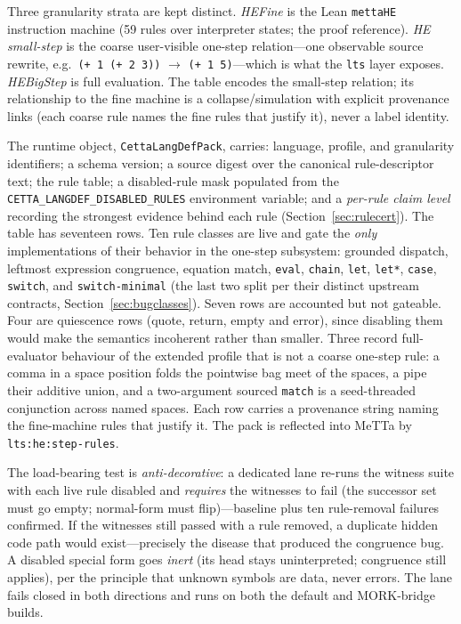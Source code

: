 \documentclass[11pt]{article}
\newcommand{\code}[1]{\texttt{#1}}
\begin{document}
Three granularity strata are kept distinct.  \emph{HEFine} is the Lean
\code{mettaHE} instruction machine (59 rules over interpreter states;
the proof reference).  \emph{HE small-step} is the coarse user-visible
one-step relation---one observable source rewrite, e.g.\
\code{(+ 1 (+ 2 3))} $\to$ \code{(+ 1 5)}---which is what the
\code{lts} layer exposes.  \emph{HEBigStep} is full evaluation.  The
table encodes the small-step relation; its relationship to the fine machine is a
collapse/simulation with explicit provenance links (each coarse rule
names the fine rules that justify it), never a label identity.

The runtime object, \code{CettaLangDefPack}, carries: language,
profile, and granularity identifiers; a schema version; a source
digest over the canonical rule-descriptor text; the rule table; a
disabled-rule mask populated from the
\code{CETTA\_LANGDEF\_DISABLED\_RULES} environment variable; and a
\emph{per-rule claim level} recording the strongest evidence behind
each rule (Section~\ref{sec:rulecert}).  The table has seventeen rows.  Ten rule classes are live and
gate the \emph{only} implementations of their behavior in the one-step
subsystem: grounded dispatch, leftmost expression congruence, equation
match, \code{eval}, \code{chain}, \code{let}, \code{let*},
\code{case}, \code{switch}, and \code{switch-minimal} (the last two
split per their distinct upstream contracts,
Section~\ref{sec:bugclasses}).  Seven rows are accounted but not
gateable.  Four are quiescence rows (quote, return, empty and error),
since disabling them would make the semantics incoherent rather than
smaller.  Three record full-evaluator behaviour of the extended profile
that is not a coarse one-step rule: a comma in a space position folds
the pointwise bag meet of the spaces, a pipe their additive union, and a
two-argument sourced \code{match} is a seed-threaded conjunction across
named spaces.  Each row carries a
provenance string naming the fine-machine rules that justify it.  The
pack is reflected into MeTTa by \code{lts:he:step-rules}.

The load-bearing test is \emph{anti-decorative}: a dedicated lane
re-runs the witness suite with each live rule disabled and
\emph{requires} the witnesses to fail (the successor set must go
empty; normal-form must flip)---baseline plus ten rule-removal
failures confirmed.  If the witnesses still passed with a rule
removed, a duplicate hidden code path would exist---precisely the
disease that produced the congruence bug.  A disabled special form
goes \emph{inert} (its head stays uninterpreted; congruence still
applies), per the principle that unknown symbols are data, never
errors.  The lane fails closed in both directions and runs on both the
default and MORK-bridge builds.
\end{document}
